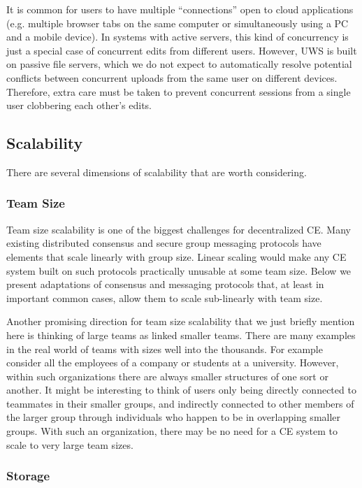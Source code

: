 \documentclass[runningheads]{llncs}
\begin{document}
It is common for users to have multiple ``connections'' open to cloud applications (e.g. multiple browser tabs on the same computer or simultaneously using a PC and a mobile device).
In systems with active servers, this kind of concurrency is just a special case of concurrent edits from different users.
However, UWS is built on passive file servers, which we do not expect to automatically resolve potential conflicts between concurrent uploads from the same user on different devices.
Therefore, extra care must be taken to prevent concurrent sessions from a single user clobbering each other's edits.

\subsection{Scalability}

There are several dimensions of scalability that are worth considering.

\subsubsection{Team Size}

Team size scalability is one of the biggest challenges for decentralized CE.
Many existing distributed consensus and secure group messaging protocols have elements that scale linearly with group size.
Linear scaling would make any CE system built on such protocols practically unusable at some team size.
Below we present adaptations of consensus and messaging protocols that, at least in important common cases, allow them to scale sub-linearly with team size.

Another promising direction for team size scalability that we just briefly mention here is thinking of large teams as linked smaller teams.
There are many examples in the real world of teams with sizes well into the thousands.
For example consider all the employees of a company or students at a university.
However, within such organizations there are always smaller structures of one sort or another.
It might be interesting to think of users only being directly connected to teammates in their smaller groups, and indirectly connected to other members of the larger group through individuals who happen to be in overlapping smaller groups.
With such an organization, there may be no need for a CE system to scale to very large team sizes.


\subsubsection{Storage}
\end{document}

